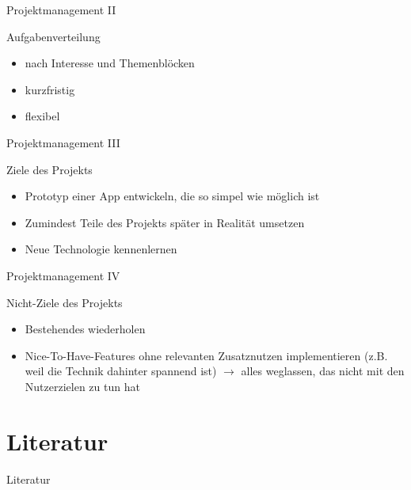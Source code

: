 \documentclass[presentation,bigger,aspectratio=169]{beamer}
\begin{document}
\begin{frame}[label={sec:orge8c7800}]{Projektmanagement II}
\begin{block}{Aufgabenverteilung}
\begin{itemize}
\item nach Interesse und Themenblöcken
\item kurzfristig
\item flexibel
\end{itemize}
\end{block}
\end{frame}
\begin{frame}[label={sec:org9358352}]{Projektmanagement III}
\begin{block}{Ziele des Projekts}
\begin{itemize}
\item Prototyp einer App entwickeln, die so simpel wie möglich ist
\item Zumindest Teile des Projekts später in Realität umsetzen
\item Neue Technologie kennenlernen
\end{itemize}
\end{block}
\end{frame}
\begin{frame}[label={sec:org18b900f}]{Projektmanagement IV}
\begin{block}{Nicht-Ziele des Projekts}
\begin{itemize}
\item Bestehendes wiederholen
\item Nice-To-Have-Features ohne relevanten Zusatznutzen implementieren (z.B. weil
die Technik dahinter spannend ist) \(\to\) alles weglassen, das nicht mit
den Nutzerzielen zu tun hat
\end{itemize}
\end{block}
\end{frame}

\section*{Literatur}
\label{sec:orgf99fea0}
\begin{frame}[allowframebreaks]{Literatur}
\printbibliography[heading=none]
\end{frame}
\appendix
\end{document}
